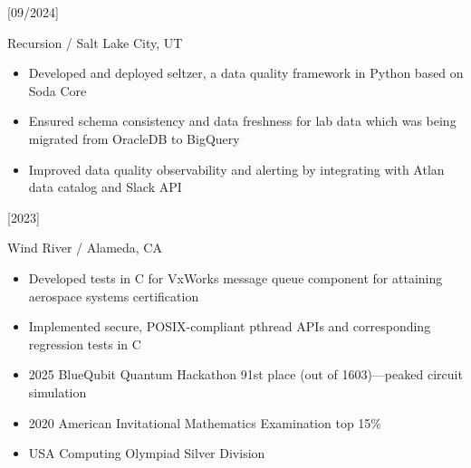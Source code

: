 \documentclass{article}
\begin{document}
[09/2024]

Recursion / Salt Lake City, UT

\begin{itemize}
  \item
  Developed and deployed seltzer, a data quality framework in Python based on
  Soda Core

  \item
  Ensured schema consistency and data freshness for lab data which was being
  migrated from OracleDB to BigQuery

  \item
  Improved data quality observability and alerting by integrating with Atlan
  data catalog and Slack API
\end{itemize}

[2023]

Wind River / Alameda, CA

\begin{itemize}
  \item
  Developed tests in C for VxWorks message queue component for attaining
  aerospace systems certification

  \item
  Implemented secure, POSIX-compliant pthread APIs and corresponding regression
  tests in C
\end{itemize}



\begin{itemize}
  \item
  2025 BlueQubit Quantum Hackathon 91st place (out of 1603)---peaked circuit simulation

  \item
  2020 American Invitational Mathematics Examination top 15\%

  \item
  USA Computing Olympiad Silver Division
\end{itemize}
\end{document}
